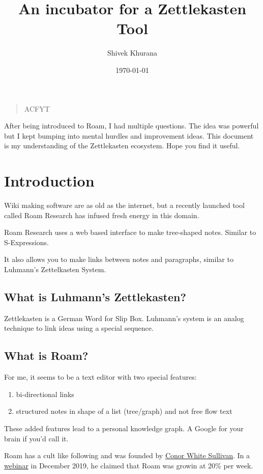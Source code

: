 \documentclass[11pt]{article}
\author{Shivek Khurana}
\date{\today}
\title{An incubator for a Zettlekasten Tool}
\begin{document}
\maketitle
\tableofcontents

\begin{quote}
ACFYT
\end{quote}

After being introduced to Roam, I had multiple questions. The idea was powerful but I kept bumping into mental hurdles and improvement ideas.
This document is my understanding of the Zettlekasten ecosystem. Hope you find it useful.

\section{Introduction}
\label{sec:org9bd3f33}
Wiki making software are as old as the internet, but a recently launched tool called Roam Research has infused fresh energy in this domain.

Roam Research uses a web based interface to make tree-shaped notes. Similar to S-Expressions.

It also allows you to make links between notes and paragraphs, similar to Luhmann’s Zettelkasten System.

\subsection{What is Luhmann's Zettlekasten?}
\label{sec:org49f54eb}
Zettlekasten is a German Word for Slip Box.
Luhmann's system is an analog technique to link ideas using a special sequence.

\subsection{What is Roam?}
\label{sec:orgb57fb96}

For me, it seems to be a text editor with two special features:
\begin{enumerate}
\item bi-directional links
\item structured notes in shape of a list (tree/graph) and not free flow text
\end{enumerate}

These added features lead to a personal knowledge graph. A Google for your brain if you'd call it.

Roam has a cult like following and was founded by \href{https://www.linkedin.com/in/cwhitesullivan/}{Conor White Sullivan}. In a \href{https://www.youtube.com/watch?v=Hw2kJF\_kxjE}{webinar} in December 2019, he claimed that Roam was growin at 20\% per week.
\end{document}
